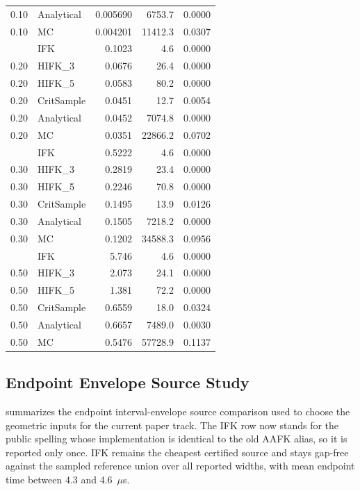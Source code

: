 \documentclass[journal]{IEEEtran}
\begin{document}
\begin{table}[t]
\begin{tabular}{@{}llrrr@{}}
    0.10 & Analytical & 0.005690 & 6753.7 & 0.0000 \\
    0.10 & MC & 0.004201 & 11412.3 & 0.0307 \\
    \addlinespace
    0.20 & IFK & 0.1023 & 4.6 & 0.0000 \\
    0.20 & HIFK\_3 & 0.0676 & 26.4 & 0.0000 \\
    0.20 & HIFK\_5 & 0.0583 & 80.2 & 0.0000 \\
    0.20 & CritSample & 0.0451 & 12.7 & 0.0054 \\
    0.20 & Analytical & 0.0452 & 7074.8 & 0.0000 \\
    0.20 & MC & 0.0351 & 22866.2 & 0.0702 \\
    \addlinespace
    0.30 & IFK & 0.5222 & 4.6 & 0.0000 \\
    0.30 & HIFK\_3 & 0.2819 & 23.4 & 0.0000 \\
    0.30 & HIFK\_5 & 0.2246 & 70.8 & 0.0000 \\
    0.30 & CritSample & 0.1495 & 13.9 & 0.0126 \\
    0.30 & Analytical & 0.1505 & 7218.2 & 0.0000 \\
    0.30 & MC & 0.1202 & 34588.3 & 0.0956 \\
    \addlinespace
    0.50 & IFK & 5.746 & 4.6 & 0.0000 \\
    0.50 & HIFK\_3 & 2.073 & 24.1 & 0.0000 \\
    0.50 & HIFK\_5 & 1.381 & 72.2 & 0.0000 \\
    0.50 & CritSample & 0.6559 & 18.0 & 0.0324 \\
    0.50 & Analytical & 0.6657 & 7489.0 & 0.0030 \\
    0.50 & MC & 0.5476 & 57728.9 & 0.1137 \\
    \bottomrule
  \end{tabular}
\end{table}

\subsection{Endpoint Envelope Source Study}\label{sec:exp_endpoint_envelopes}

 summarizes the endpoint interval-envelope
source comparison used to choose the geometric inputs for the current paper
track. The IFK row now stands for the public spelling whose implementation is
identical to the old AAFK alias, so it is reported only once. IFK remains the
cheapest certified source and stays gap-free against the sampled reference
union over all reported widths, with mean endpoint time between 4.3 and
4.6~$\mu$s.
\end{document}
